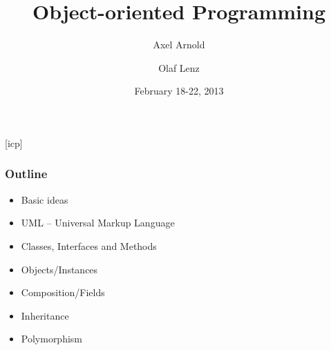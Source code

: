 \documentclass{slides}
\begin{document}
\graphicspath{{figures/}}

\title[Object-oriented Programming]{\Large Object-oriented Programming}

\author[A. Arnold and O. Lenz]{Axel Arnold \and Olaf Lenz} 
\date{February 18-22, 2013}

\begin{frame}
  \titlepage
\end {frame}
[icp]

\begin{frame}
  \frametitle{Outline}

  \begin{itemize}
  \item Basic ideas
  \item UML -- Universal Markup Language
  \item Classes, Interfaces and Methods
  \item Objects/Instances
  \item Composition/Fields
  \item Inheritance
  \item Polymorphism
  \end{itemize}
  
\end{frame}
\end{document}
